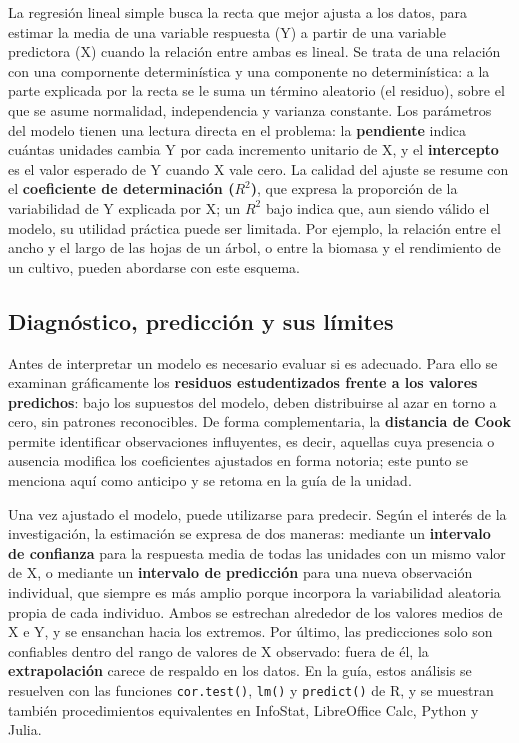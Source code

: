 \documentclass[
  spanish,
  letterpaper,
  DIV=11,
  numbers=noendperiod]{scrreprt}
\begin{document}
La regresión lineal simple busca la recta que mejor ajusta a los datos,
para estimar la media de una variable respuesta (Y) a partir de una
variable predictora (X) cuando la relación entre ambas es lineal. Se
trata de una relación con una compornente determinística y una
componente no determinística: a la parte explicada por la recta se le
suma un término aleatorio (el residuo), sobre el que se asume
normalidad, independencia y varianza constante. Los parámetros del
modelo tienen una lectura directa en el problema: la \textbf{pendiente}
indica cuántas unidades cambia Y por cada incremento unitario de X, y el
\textbf{intercepto} es el valor esperado de Y cuando X vale cero. La
calidad del ajuste se resume con el \textbf{coeficiente de determinación
(\(R^2\))}, que expresa la proporción de la variabilidad de Y explicada
por X; un \(R^2\) bajo indica que, aun siendo válido el modelo, su
utilidad práctica puede ser limitada. Por ejemplo, la relación entre el
ancho y el largo de las hojas de un árbol, o entre la biomasa y el
rendimiento de un cultivo, pueden abordarse con este esquema.

\subsection{Diagnóstico, predicción y sus
límites}\label{diagnuxf3stico-predicciuxf3n-y-sus-luxedmites}

Antes de interpretar un modelo es necesario evaluar si es adecuado. Para
ello se examinan gráficamente los \textbf{residuos estudentizados frente
a los valores predichos}: bajo los supuestos del modelo, deben
distribuirse al azar en torno a cero, sin patrones reconocibles. De
forma complementaria, la \textbf{distancia de Cook} permite identificar
observaciones influyentes, es decir, aquellas cuya presencia o ausencia
modifica los coeficientes ajustados en forma notoria; este punto se
menciona aquí como anticipo y se retoma en la guía de la unidad.

Una vez ajustado el modelo, puede utilizarse para predecir. Según el
interés de la investigación, la estimación se expresa de dos maneras:
mediante un \textbf{intervalo de confianza} para la respuesta media de
todas las unidades con un mismo valor de X, o mediante un
\textbf{intervalo de predicción} para una nueva observación individual,
que siempre es más amplio porque incorpora la variabilidad aleatoria
propia de cada individuo. Ambos se estrechan alrededor de los valores
medios de X e Y, y se ensanchan hacia los extremos. Por último, las
predicciones solo son confiables dentro del rango de valores de X
observado: fuera de él, la \textbf{extrapolación} carece de respaldo en
los datos. En la guía, estos análisis se resuelven con las funciones
\texttt{cor.test()}, \texttt{lm()} y \texttt{predict()} de R, y se
muestran también procedimientos equivalentes en InfoStat, LibreOffice
Calc, Python y Julia.
\end{document}
